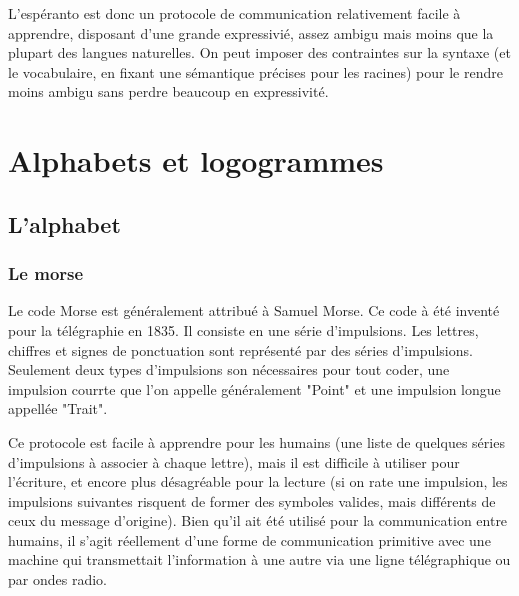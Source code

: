 \documentclass[french,a4paper]{article}
\begin{document}
L'espéranto est donc un protocole de communication relativement facile
à apprendre, disposant d'une grande expressivié, assez ambigu mais
moins que la plupart des langues naturelles. On peut imposer des
contraintes sur la syntaxe (et le vocabulaire, en fixant une
sémantique précises pour les racines) pour le rendre moins ambigu sans
perdre beaucoup en expressivité.

\section{Alphabets et logogrammes}

\subsection{L'alphabet}



\subsubsection{Le morse}
Le code Morse est généralement attribué à Samuel Morse. Ce code à été inventé pour la télégraphie en 1835.
Il consiste en une série d'impulsions. Les lettres, chiffres et signes de ponctuation sont représenté par des séries d'impulsions.
Seulement deux types d'impulsions son nécessaires pour tout coder, une impulsion courrte que l'on appelle généralement
"Point" et une impulsion longue appellée "Trait".

Ce protocole est facile à apprendre pour les humains (une liste de quelques séries d'impulsions à associer à chaque lettre), mais il est
difficile à utiliser pour l'écriture, et encore plus désagréable pour la lecture (si on rate une impulsion, les impulsions suivantes
risquent de former des symboles valides, mais différents de ceux du message d'origine). Bien qu'il ait été utilisé pour la communication
entre humains, il s'agit réellement d'une forme de communication primitive avec une machine qui transmettait l'information à une autre via
une ligne télégraphique ou par ondes radio.
\end{document}
